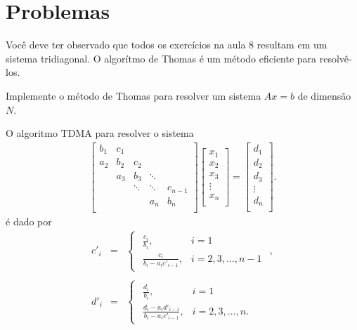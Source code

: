 \section{Problemas}
Você deve ter observado que todos os exercícios na aula 8 resultam em um sistema tridiagonal. O algorítmo de Thomas é um método eficiente para resolvê-los.
\begin{ex}Implemente o método de Thomas para resolver um sistema $Ax=b$ de dimensão $N$. 
\end{ex}
O algoritmo TDMA para resolver o sistema
\begin{eqnarray*}\label{linsis:EqTriDiag.0} \begin{bmatrix}
   {b_1} & {c_1} & {   } & {   } & {   } \\
   {a_2} & {b_2} & {c_2} & {   } & {   } \\
   {   } & {a_3} & {b_3} & \ddots & {   } \\
   {   } & {   } & \ddots & \ddots & {c_{n-1}}\\
   {   } & {   } & {   } & {a_n} & {b_n}\\
\end{bmatrix}
\begin{bmatrix}
   {x_1 }  \\
   {x_2 }  \\
   {x_3 }  \\
   \vdots   \\
   {x_n }  \\
\end{bmatrix}
=
\begin{bmatrix}
   {d_1 }  \\
   {d_2 }  \\
   {d_3 }  \\
   \vdots   \\
   {d_n }  \\
\end{bmatrix}
.
\end{eqnarray*}
é dado por
\begin{eqnarray*}\label{linsis:TriDiag_1.1}
 c'_i &=&
\begin{cases}
\begin{array}{lcl}
  \frac{c_i}{b_i}                   , & i = 1 \\
  \frac{c_i}{b_i - a_i c'_{i - 1}}  , & i = 2, 3, \dots, n-1
\end{array}
\end{cases},\\
\text{}\nonumber\\
d'_i &=&
\begin{cases}
\begin{array}{lcl}
  \frac{d_i}{b_i}                   , & i = 1 \\
  \frac{d_i - a_i d'_{i - 1}}{b_i - a_i c'_{i - 1}}  , & i = 2, 3, \dots, n.
\end{array}
\end{cases}
\end{eqnarray*}
